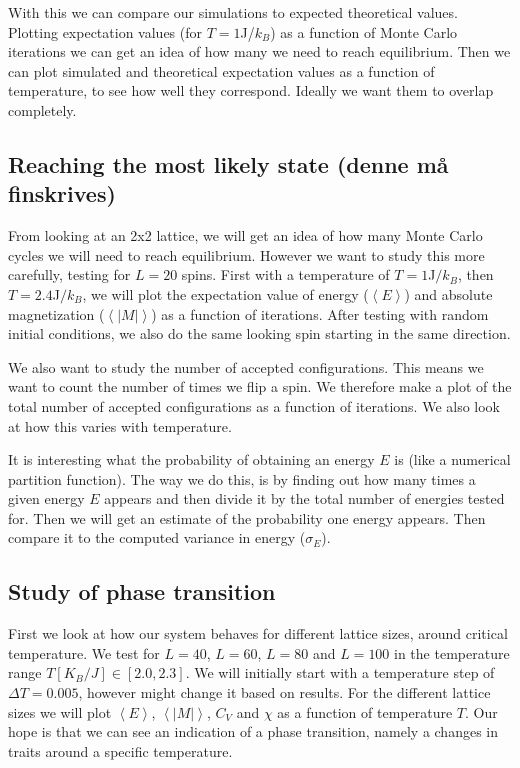 \documentclass[reprint, english,notitlepage,nofootinbib]{revtex4-1}  %
\begin{document}
With this we can compare our simulations to expected theoretical values. Plotting expectation values (for $T=1$J/$k_B$) as a function of Monte Carlo iterations we can get an idea of how many we need to reach equilibrium. Then we can plot simulated and theoretical expectation values as a function of temperature, to see how well they correspond. Ideally we want them to overlap completely.

\subsection{Reaching the most likely state (denne må finskrives)}
From looking at an 2x2 lattice, we will get an idea of how many Monte Carlo cycles we will need to reach equilibrium. However we want to study this more carefully, testing for $L=20$ spins. First with a temperature of $T = 1 $J$/k_B$, then $T = 2.4 $J$/k_B$, we will plot the expectation value of energy ($\left<E\right>$) and absolute magnetization ($\left<|M|\right>$) as a function of iterations. After testing with random initial conditions, we also do the same looking spin starting in the same direction.

We also want to study the number of accepted configurations. This means we want to count the number of times we flip a spin. We therefore make a plot of the total number of accepted configurations as a function of iterations. We also look at how this varies with temperature.

It is interesting what the probability of obtaining an energy $E$ is (like a numerical partition function). The way we do this, is by finding out how many times a given energy $E$ appears and then divide it by the total number of energies tested for. Then we will get an estimate of the probability one energy appears. Then compare it to the computed variance in energy ($\sigma_E$).

\subsection{Study of phase transition}

First we look at how our system behaves for different lattice sizes, around critical temperature. We test for $L=40$, $L=60$, $L=80$ and $L=100$ in the temperature range $T[K_B/J]\in [2.0, 2.3]$. We will initially start with a temperature step of $\Delta T = 0.005$, however might change it based on results. For the different lattice sizes we will plot $\left<E\right>$, $\left<|M|\right>$, $C_V$ and $\chi$ as a function of temperature $T$. Our hope is that we can see an indication of a phase transition, namely a changes in traits around a specific temperature.
\end{document}
